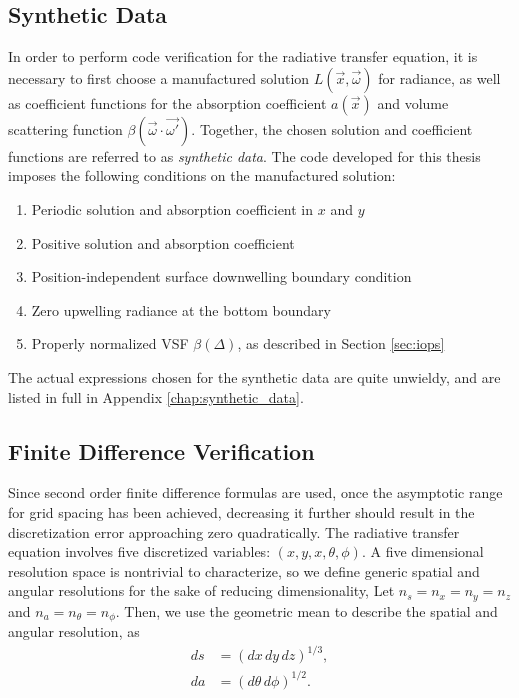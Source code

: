 \subsection{Synthetic Data}
\label{sec:synthetic_data}
In order to perform code verification for the radiative transfer equation, it is necessary to first choose a manufactured solution $L(\vec{x}, \vec{\omega})$ for radiance, as well as coefficient functions for the absorption coefficient $a(\vec{x})$ and volume scattering function $\beta(\vec{\omega}\cdot\vec{\omega'})$.
Together, the chosen solution and coefficient functions are referred to as \textit{synthetic data}.
The code developed for this thesis imposes the following conditions on the manufactured solution:
\begin{enumerate}
  \item Periodic solution and absorption coefficient in $x$ and $y$
  \item Positive solution and absorption coefficient
  \item Position-independent surface downwelling boundary condition
  \item Zero upwelling radiance at the bottom boundary
  \item Properly normalized VSF $\beta(\Delta)$, as described in Section \ref{sec:iops}
\end{enumerate}
The actual expressions chosen for the synthetic data are quite unwieldy, and are listed in full in Appendix \ref{chap:synthetic_data}.


\subsection{Finite Difference Verification}
Since second order finite difference formulas are used, once the asymptotic range for grid spacing has been achieved, decreasing it further should result in the discretization error approaching zero quadratically.
The radiative transfer equation involves five discretized variables: $(x,y,x,\theta,\phi)$.
A five dimensional resolution space is nontrivial to characterize, so we define generic spatial and angular resolutions for the sake of reducing dimensionality,
Let $n_s = n_x = n_y = n_z$ and $n_a = n_\theta = n_\phi$.
Then, we use the geometric mean to describe the spatial and angular resolution, as
\begin{align}
  ds &= (dx\, dy\, dz)^{1/3}, \\
  da &= (d\theta\, d\phi)^{1/2}.
\end{align}

